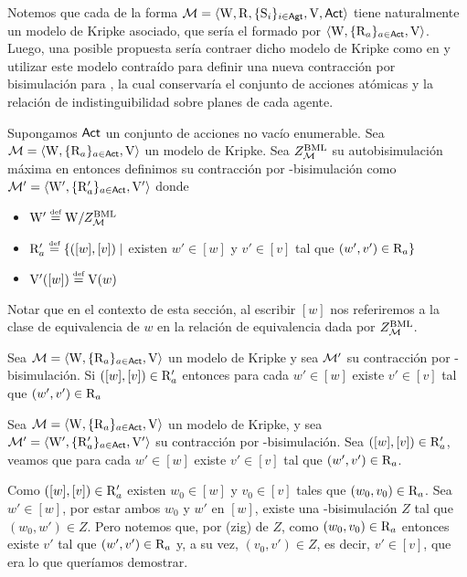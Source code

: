 Notemos que cada \ults de la forma $\mathcal{M}=\langle \mathrm{W},\mathrm{R},\{ \mathrm{S}_i \}_{i \in {\rm \sf Agt}},\mathrm{V},{\rm \sf Act} \rangle$ tiene naturalmente un modelo de Kripke asociado, 
que sería el formado por $\langle \mathrm{W},\{\mathrm{R}_a\}_{a\in{\rm \sf Act}},\mathrm{V} \rangle$. Luego, una posible propuesta sería contraer dicho modelo de Kripke como en 
\bml y utilizar este modelo contraído para definir una nueva contracción por bisimulación para \KHilogic, la cual conservaría el 
conjunto de acciones atómicas y la relación de indistinguibilidad sobre planes de cada agente.

\begin{definicion}
    Supongamos ${\rm \sf Act}$ un conjunto de acciones no vacío enumerable.
    Sea $\mathcal{M} = \langle \mathrm{W},\{\mathrm{R}_a\}_{a\in{\rm \sf Act}},\mathrm{V} \rangle$ un modelo de Kripke. Sea $Z^{\mathrm{BML}}_{\mathcal{M}}$ su autobisimulación máxima en \bml 
    entonces definimos su contracción por \bml-bisimulación como $\mathcal{M}' = \langle \mathrm{W}',\{\mathrm{R}'_a\}_{a\in{\rm \sf Act}},\mathrm{V}' \rangle$ donde
    \begin{center}
        \begin{itemize}
            \item $\W' \eqdef \W /Z^{\bml}_\model$
            \item $\R_a' \eqdef \{([w],[v]) \mid$ existen $w' \in [w]$ y $v' \in [v]$ tal que $(w',v') \in \mathrm{R}_a \}$
            \item $\V'([w]) \eqdef \V(w)$
        \end{itemize}
    \end{center} 
\end{definicion}

Notar que en el contexto de esta sección, al escribir $[w]$ nos referiremos a la clase de equivalencia de $w$ en la relación de 
equivalencia dada por $Z^{\mathrm{BML}}_{\mathcal{M}}$.

\begin{lema}\label{lema:bml-R-lema}
    Sea $\mathcal{M} = \langle \mathrm{W},\{\mathrm{R}_a\}_{a\in{\rm \sf Act}},\mathrm{V} \rangle$ un modelo de Kripke y sea $\mathcal{M}'$ su 
    contracción por \bml-bisimulación. Si $([w],[v]) \in \mathrm{R}'_a$ entonces para cada $w' \in [w]$ existe $v' \in [v]$ tal que $(w',v') \in \mathrm{R}_a$
\end{lema}

\begin{demostracion}
    Sea $\mathcal{M} = \langle \mathrm{W},\{\mathrm{R}_a\}_{a\in{\rm \sf Act}},\mathrm{V} \rangle$ un modelo de Kripke, y sea $\mathcal{M}' = \langle \mathrm{W}',\{\mathrm{R}_a'\}_{a\in{\rm \sf Act}},\mathrm{V}' \rangle$ su 
    contracción por \bml-bisimulación. Sea $([w],[v]) \in \mathrm{R}'_a$, veamos que para cada $w' \in [w]$ existe $v' \in [v]$ tal que 
    $(w',v') \in \mathrm{R}_a$.

    Como $([w],[v]) \in \mathrm{R}'_a$ existen $w_0 \in [w]$ y $v_0 \in [v]$ tales que $(w_0,v_0)\in \mathrm{R}_a$. Sea $w' \in [w]$, por estar ambos 
    $w_0$ y $w'$ en $[w]$, existe una \bml-bisimulación $Z$ tal que $(w_0,w') \in Z$. Pero notemos que, por (zig) de $Z$, como 
    $(w_0,v_0) \in \mathrm{R}_a$  entonces existe $v'$ tal que $(w',v') \in \mathrm{R}_a$ y, a su vez, 
    $(v_0,v') \in Z$, es decir, $v' \in [v]$, que era lo que queríamos demostrar.
\end{demostracion}

